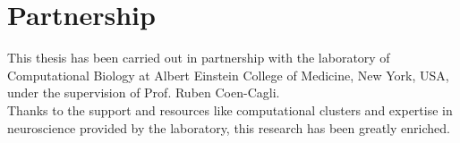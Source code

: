 \section{Partnership}

This thesis has been carried out in partnership with the laboratory of Computational Biology at Albert Einstein College of Medicine, New York, USA, under the supervision of Prof. Ruben Coen-Cagli.\\
Thanks to the support and resources like computational clusters and expertise in neuroscience provided by the laboratory, this research has been greatly enriched.
